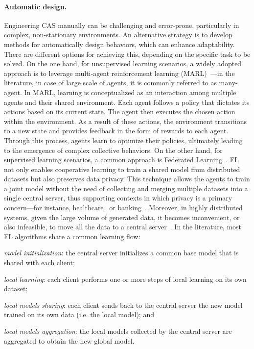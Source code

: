 \documentclass[12pt]{article}
\begin{document}
\paragraph{Automatic design.}
Engineering CAS manually can be challenging and error-prone, particularly in complex, 
 non-stationary environments. 
% 
An alternative strategy is to develop methods for automatically design 
 behaviors, which can enhance adaptability.
%
There are different options for achieving this, depending on the specific task to be solved. 
%
On the one hand, for unsupervised learning scenarios, a widely adopted approach is to leverage multi-agent 
 reinforcement learning (MARL)~\cite{DBLP:journals/corr/abs-1911-10635,DBLP:journals/tsmc/BusoniuBS08}---in the 
 literature, in case of large scale of agents, it is commonly referred to as many-agent. 
% 
In MARL, learning is conceptualized as an interaction among multiple agents and their shared environment. 
%
Each agent follows a policy that dictates its actions based on its current state. 
%
The agent then executes the chosen action within the environment. 
%
As a result of these actions, the environment transitions to a new state and provides feedback 
 in the form of rewards to each agent. 
% 
Through this process, agents learn to optimize their policies, ultimately leading to the 
 emergence of complex collective behaviors.
%
On the other hand, for supervised learning scenarios, a common approach is 
 Federated Learning~\cite{DBLP:conf/aistats/McMahanMRHA17}.
%
FL not only enables cooperative learning to train a shared model from distributed datasets
 but also preserves data privacy.
%
This technique allows the agents to train a joint model without the need of collecting and merging
 multiple datasets into a single central server, thus supporting contexts in which privacy is a primary 
 concern---for instance, healthcare~\cite{DBLP:journals/csur/NguyenPPDSLDH23} 
 or banking~\cite{DBLP:series/lncs/LongT0Z20}.
%
Moreover, in highly distributed systems, given the large volume of generated data, it becomes inconvenient, 
 or also infeasible, to move all the data to a central server~\cite{DBLP:journals/comsur/NguyenDPSLP21}.
%
In the literature, most FL algorithms share a common learning flow: 
 \begin{enumerate*}[label=(\roman*)]
	\item \emph{model initialization}: the central server initializes a common base model that is shared with each client;
	\item \emph{local learning}: each client performs one or more steps of local learning on its own dataset;
	\item \emph{local models sharing}: each client sends back to the central server the new model trained on its own data 
     (i.e. the local model); and
	\item \emph{local models aggregation}: the local models collected by the central server are aggregated to obtain the 
     new global model.
 \end{enumerate*}
\end{document}
